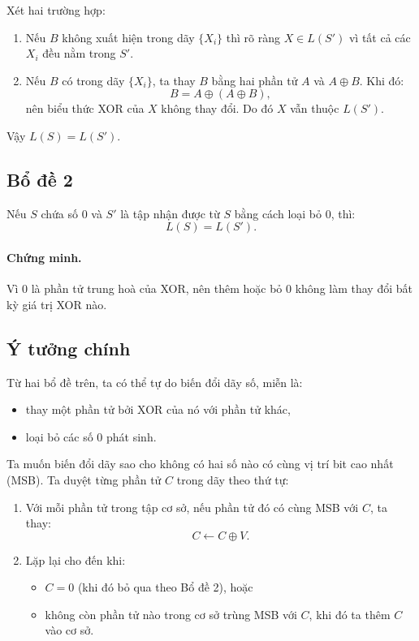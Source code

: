 Xét hai trường hợp:
\begin{enumerate}
    \item Nếu $B$ không xuất hiện trong dãy $\{X_i\}$ thì rõ ràng $X \in L(S')$ vì tất cả các $X_i$ đều nằm trong $S'$.
    \item Nếu $B$ có trong dãy $\{X_i\}$, ta thay $B$ bằng hai phần tử $A$ và $A\oplus B$. Khi đó:
    \[
    B = A \oplus (A \oplus B),
    \]
    nên biểu thức XOR của $X$ không thay đổi. Do đó $X$ vẫn thuộc $L(S')$.
\end{enumerate}

Vậy $L(S)=L(S')$.

\subsection*{Bổ đề 2}

Nếu $S$ chứa số $0$ và $S'$ là tập nhận được từ $S$ bằng cách loại bỏ $0$, thì:
\[
L(S)=L(S').
\]

\paragraph{Chứng minh.}  
Vì $0$ là phần tử trung hoà của XOR, nên thêm hoặc bỏ $0$ không làm thay đổi bất kỳ giá trị XOR nào.

\subsection*{Ý tưởng chính}

Từ hai bổ đề trên, ta có thể tự do biến đổi dãy số, miễn là:
\begin{itemize}
    \item thay một phần tử bởi XOR của nó với phần tử khác,
    \item loại bỏ các số $0$ phát sinh.
\end{itemize}

Ta muốn biến đổi dãy sao cho không có hai số nào có cùng vị trí bit cao nhất (MSB).  
Ta duyệt từng phần tử $C$ trong dãy theo thứ tự:

\begin{enumerate}
    \item Với mỗi phần tử trong tập cơ sở, nếu phần tử đó có cùng MSB với $C$, ta thay:
    \[
    C \leftarrow C \oplus V.
    \]
    \item Lặp lại cho đến khi:
    \begin{itemize}
        \item $C = 0$ (khi đó bỏ qua theo Bổ đề 2), hoặc
        \item không còn phần tử nào trong cơ sở trùng MSB với $C$, khi đó ta thêm $C$ vào cơ sở.
    \end{itemize}
\end{enumerate}

